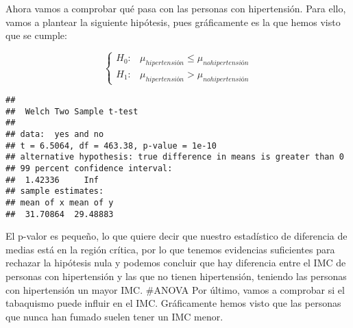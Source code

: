 \documentclass[
]{article}
\newenvironment{Shaded}{\begin{snugshade}}{\end{snugshade}}
\newcommand{\AttributeTok}[1]{\textcolor[rgb]{0.77,0.63,0.00}{#1}}
\newcommand{\CommentTok}[1]{\textcolor[rgb]{0.56,0.35,0.01}{\textit{#1}}}
\newcommand{\ConstantTok}[1]{\textcolor[rgb]{0.00,0.00,0.00}{#1}}
\newcommand{\DecValTok}[1]{\textcolor[rgb]{0.00,0.00,0.81}{#1}}
\newcommand{\FloatTok}[1]{\textcolor[rgb]{0.00,0.00,0.81}{#1}}
\newcommand{\FunctionTok}[1]{\textcolor[rgb]{0.00,0.00,0.00}{#1}}
\newcommand{\NormalTok}[1]{#1}
\newcommand{\OtherTok}[1]{\textcolor[rgb]{0.56,0.35,0.01}{#1}}
\newcommand{\SpecialCharTok}[1]{\textcolor[rgb]{0.00,0.00,0.00}{#1}}
\newcommand{\StringTok}[1]{\textcolor[rgb]{0.31,0.60,0.02}{#1}}
\begin{document}
Ahora vamos a comprobar qué pasa con las personas con hipertensión. Para
ello, vamos a plantear la siguiente hipótesis, pues gráficamente es la
que hemos visto que se cumple:

\[ \left\{ \begin{array}{lc}
             H_{0}: & \mu_{hipertensión} \leq \mu_{no hipertensión} \\
             H_{1}: & \mu_{hipertensión} > \mu_{no hipertensión}
             \end{array}
   \right. \]

\begin{Shaded}
\end{Shaded}

\begin{verbatim}
## 
##  Welch Two Sample t-test
## 
## data:  yes and no
## t = 6.5064, df = 463.38, p-value = 1e-10
## alternative hypothesis: true difference in means is greater than 0
## 99 percent confidence interval:
##  1.42336     Inf
## sample estimates:
## mean of x mean of y 
##  31.70864  29.48883
\end{verbatim}

El p-valor es pequeño, lo que quiere decir que nuestro estadístico de
diferencia de medias está en la región crítica, por lo que tenemos
evidencias suficientes para rechazar la hipótesis nula y podemos
concluir que hay diferencia entre el IMC de personas con hipertensión y
las que no tienen hipertensión, teniendo las personas con hipertensión
un mayor IMC. \#ANOVA Por último, vamos a comprobar si el tabaquismo
puede influir en el IMC. Gráficamente hemos visto que las personas que
nunca han fumado suelen tener un IMC menor.
\end{document}
